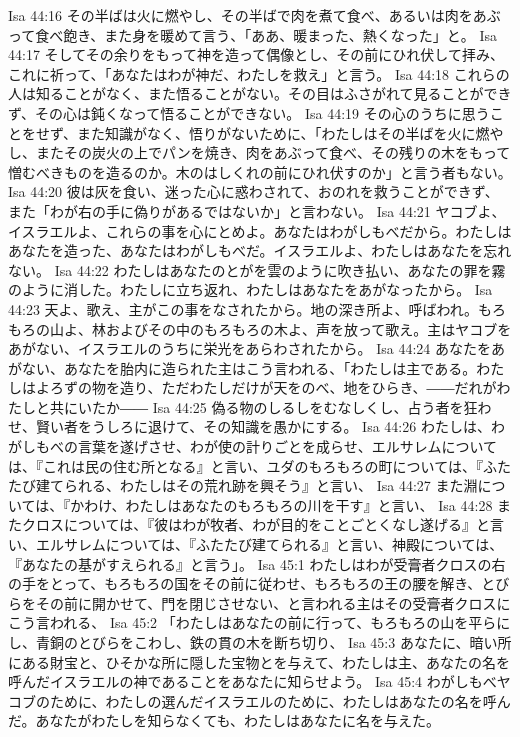 Isa 44:16  その半ばは火に燃やし、その半ばで肉を煮て食べ、あるいは肉をあぶって食べ飽き、また身を暖めて言う、「ああ、暖まった、熱くなった」と。
Isa 44:17  そしてその余りをもって神を造って偶像とし、その前にひれ伏して拝み、これに祈って、「あなたはわが神だ、わたしを救え」と言う。
Isa 44:18  これらの人は知ることがなく、また悟ることがない。その目はふさがれて見ることができず、その心は鈍くなって悟ることができない。
Isa 44:19  その心のうちに思うことをせず、また知識がなく、悟りがないために、「わたしはその半ばを火に燃やし、またその炭火の上でパンを焼き、肉をあぶって食べ、その残りの木をもって憎むべきものを造るのか。木のはしくれの前にひれ伏すのか」と言う者もない。
Isa 44:20  彼は灰を食い、迷った心に惑わされて、おのれを救うことができず、また「わが右の手に偽りがあるではないか」と言わない。
Isa 44:21  ヤコブよ、イスラエルよ、これらの事を心にとめよ。あなたはわがしもべだから。わたしはあなたを造った、あなたはわがしもべだ。イスラエルよ、わたしはあなたを忘れない。
Isa 44:22  わたしはあなたのとがを雲のように吹き払い、あなたの罪を霧のように消した。わたしに立ち返れ、わたしはあなたをあがなったから。
Isa 44:23  天よ、歌え、主がこの事をなされたから。地の深き所よ、呼ばわれ。もろもろの山よ、林およびその中のもろもろの木よ、声を放って歌え。主はヤコブをあがない、イスラエルのうちに栄光をあらわされたから。
Isa 44:24  あなたをあがない、あなたを胎内に造られた主はこう言われる、「わたしは主である。わたしはよろずの物を造り、ただわたしだけが天をのべ、地をひらき、――だれがわたしと共にいたか――
Isa 44:25  偽る物のしるしをむなしくし、占う者を狂わせ、賢い者をうしろに退けて、その知識を愚かにする。
Isa 44:26  わたしは、わがしもべの言葉を遂げさせ、わが使の計りごとを成らせ、エルサレムについては、『これは民の住む所となる』と言い、ユダのもろもろの町については、『ふたたび建てられる、わたしはその荒れ跡を興そう』と言い、
Isa 44:27  また淵については、『かわけ、わたしはあなたのもろもろの川を干す』と言い、
Isa 44:28  またクロスについては、『彼はわが牧者、わが目的をことごとくなし遂げる』と言い、エルサレムについては、『ふたたび建てられる』と言い、神殿については、『あなたの基がすえられる』と言う」。
Isa 45:1  わたしはわが受膏者クロスの右の手をとって、もろもろの国をその前に従わせ、もろもろの王の腰を解き、とびらをその前に開かせて、門を閉じさせない、と言われる主はその受膏者クロスにこう言われる、
Isa 45:2  「わたしはあなたの前に行って、もろもろの山を平らにし、青銅のとびらをこわし、鉄の貫の木を断ち切り、
Isa 45:3  あなたに、暗い所にある財宝と、ひそかな所に隠した宝物とを与えて、わたしは主、あなたの名を呼んだイスラエルの神であることをあなたに知らせよう。
Isa 45:4  わがしもべヤコブのために、わたしの選んだイスラエルのために、わたしはあなたの名を呼んだ。あなたがわたしを知らなくても、わたしはあなたに名を与えた。
